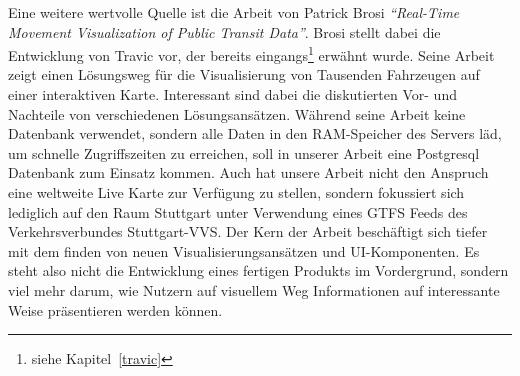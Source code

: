 \begin{newpage}
    Eine weitere wertvolle Quelle ist die Arbeit von Patrick Brosi \textit{"`Real-Time Movement Visualization of Public Transit Data"'}\parencite{brosi}. Brosi stellt dabei die Entwicklung von Travic vor, der bereits eingangs\footnote{siehe Kapitel~\ref{travic}} erwähnt wurde. Seine Arbeit zeigt einen Lösungsweg für die Visualisierung von Tausenden Fahrzeugen auf einer interaktiven Karte. Interessant sind dabei die diskutierten Vor- und Nachteile von verschiedenen Lösungsansätzen.
    Während seine Arbeit keine Datenbank verwendet, sondern alle Daten in den RAM-Speicher des Servers läd, um schnelle Zugriffszeiten zu erreichen, soll in unserer Arbeit eine Postgresql Datenbank zum Einsatz kommen. 
    Auch hat unsere Arbeit nicht den Anspruch eine weltweite Live Karte zur Verfügung zu stellen, sondern fokussiert sich lediglich auf den Raum Stuttgart unter Verwendung eines GTFS Feeds des Verkehrsverbundes Stuttgart-VVS. 
    Der Kern der Arbeit beschäftigt sich tiefer mit dem finden von neuen Visualisierungsansätzen und UI-Komponenten. Es steht also nicht die Entwicklung eines fertigen Produkts im Vordergrund, sondern viel mehr darum, wie Nutzern auf visuellem Weg Informationen auf interessante Weise präsentieren werden können.


\end{newpage}
